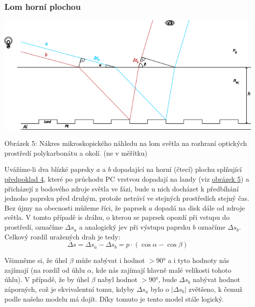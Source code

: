 \documentclass[titlepage]{article}
\begin{document}
\pagebreak

 \label{subsubsec:4.3.1}
\subsubsection{Lom horní plochou}

 \label{image:5}
\includegraphics[width=\textwidth]{microdrawing.png}
\begin{center}
    Obrázek 5: Nákres mikroskopického náhledu na lom světla na rozhraní optických prostředí polykarbonátu a okolí. (ne v měřítku)
\end{center}

Uvážíme-li dva blízké paprsky $a$ a $b$ dopadající na horní (čtecí) plochu splňující \hyperref[approx:4]{předpoklad 4}, které po průchodu PC vrstvou dopadají na landy (viz \hyperref[image:5]{obrázek 5}) a přicházejí z bodového zdroje světla ve fázi, bude u nich docházet k předbíhání jednoho paprsku před druhým, protože netráví ve stejných prostředích stejný čas.
Bez újmy na obecnosti můžeme říci, že paprsek $a$ dopadá na disk dále od zdroje světla.
V tomto případě is dráhu, o kterou se paprsek opozdí při vstupu do prostředí, označíme $\Delta s_a$ a analogický jev při výstupu paprsku $b$ označíme $\Delta s_b$.
Celkový rozdíl uražených drah je tedy:
\begin{equation}
    \label{eq1}
    \Delta s = \Delta s_a - \Delta s_b = p \cdot (\cos{\alpha} - \cos{\beta})
\end{equation}

Všimněme si, že úhel $\beta$ může nabývat i hodnot $>90$° a i tyto hodnoty nás zajímají (na rozdíl od úhlu $\alpha$, kde nás zajímají hlavně malé velikosti tohoto úhlu). V případě, že by úhel $\beta$ nabyl hodnot $>90$°, bude $\Delta s_b$ nabývat hodnot záporných, což je ekvivalentní tomu, kdyby $\Delta s_a$ bylo o $|\Delta s_b|$ zvětšeno, k čemuž podle našeho modelu má dojít. Díky tomuto je tento model stále logický.
\end{document}
